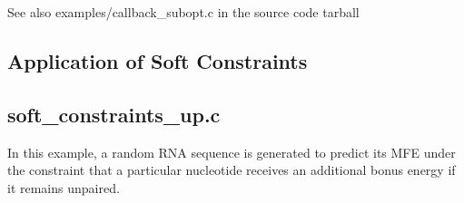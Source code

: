  \begin{DoxySeeAlso}{See also}
{\ttfamily examples/callback\+\_\+subopt.\+c} in the source code tarball
\end{DoxySeeAlso}
\hypertarget{examples_c_ex_c_sc}{}\subsection{Application of Soft Constraints}\label{examples_c_ex_c_sc}
\subsection*{soft\+\_\+constraints\+\_\+up.\+c }

In this example, a random R\+NA sequence is generated to predict its M\+FE under the constraint that a particular nucleotide receives an additional bonus energy if it remains unpaired.


